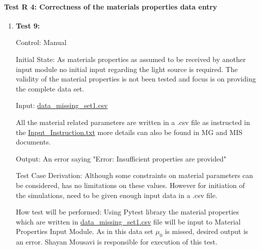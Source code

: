 \documentclass[12pt, titlepage]{article}
\begin{document}
\paragraph{Test R 4: Correctness of the materials properties data entry}
\begin{enumerate}
\item{\textbf{Test 9:} \\}

Control: Manual

Initial State: As materials properties as assumed to be received by another input module no initial input regarding the light source is required. The validity of the material properties is not been tested and focus is on providing the complete data set.

Input: \href{https://github.com/shmouses/SPDFM/blob/master/src/TestCase/data_missing_set1.csv}{data\_missing\_set1.csv} 

All the material related parameters are written in a .csv file as instructed in the \href{https://github.com/shmouses/SPDFM/blob/master/src/TestCase/Input_Instruction.txt}{Input\_Instruction.txt} more details can also be found in MG and MIS documents. 

Output: An error saying "Error: Insufficient properties are provided"

Test Case Derivation: Although some constraints on material parameters can be considered, \progname{} has no limitations on these values. However for initiation of the simulations, \progname{} need to be given enough input data in a .csv file.  

How test will be performed: Using Pytest library the material properties which are written in \href{https://github.com/shmouses/SPDFM/blob/master/src/TestCase/data_missing_set1.csv}{data\_missing\_set1.csv} file will be input to Material Properties Input Module. As in this data set $\mu_0$ is missed, desired output is an error. Shayan Mousavi is responsible for execution of this test.  

 
\end{enumerate}
\end{document}

